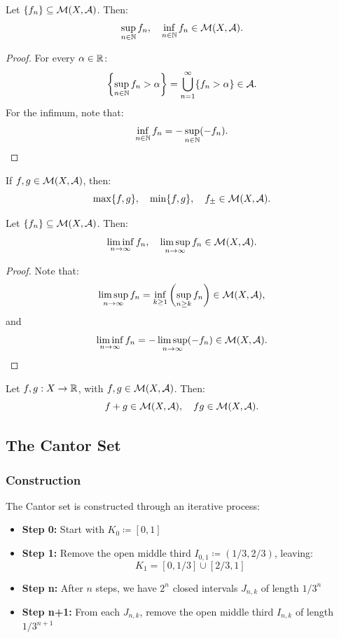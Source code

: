 \begin{theorem}
Let $\{f_n\} \subseteq \mathcal{M}(X,\mathcal{A})$. Then:
\[
\sup_{n \in \mathbb{N}} f_n, \quad \inf_{n \in \mathbb{N}} f_n \in \mathcal{M}(X,\mathcal{A}).
\]
\end{theorem}

\begin{proof}
For every $\alpha \in \mathbb{R}$:
\[
\left\{ \sup_{n \in \mathbb{N}} f_n > \alpha \right\} = \bigcup_{n=1}^{\infty} \{ f_n > \alpha \} \in \mathcal{A}.
\]
For the infimum, note that:
\[
\inf_{n \in \mathbb{N}} f_n = -\sup_{n \in \mathbb{N}} (-f_n).
\]
\end{proof}

\begin{corollary}
If $f,g \in \mathcal{M}(X,\mathcal{A})$, then:
\[
\max\{f,g\}, \quad \min\{f,g\}, \quad f_{\pm} \in \mathcal{M}(X,\mathcal{A}).
\]
\end{corollary}

\begin{theorem}
Let $\{f_n\} \subseteq \mathcal{M}(X,\mathcal{A})$. Then:
\[
\liminf_{n \to \infty} f_n, \quad \limsup_{n \to \infty} f_n \in \mathcal{M}(X,\mathcal{A}).
\]
\end{theorem}

\begin{proof}
Note that:
\[
\limsup_{n \to \infty} f_n = \inf_{k \geq 1} \left( \sup_{n \geq k} f_n \right) \in \mathcal{M}(X,\mathcal{A}),
\]
and
\[
\liminf_{n \to \infty} f_n = -\limsup_{n \to \infty} (-f_n) \in \mathcal{M}(X,\mathcal{A}).
\]
\end{proof}

\begin{theorem}
Let $f,g:X \to \mathbb{R}$, with $f,g \in \mathcal{M}(X,\mathcal{A})$. Then:
\[
f + g \in \mathcal{M}(X,\mathcal{A}), \quad fg \in \mathcal{M}(X,\mathcal{A}).
\]
\end{theorem}

\subsection{The Cantor Set}

\subsubsection{Construction}

The Cantor set is constructed through an iterative process:

\begin{itemize}
    \item \textbf{Step 0:} Start with $K_0 \coloneqq [0,1]$
    \item \textbf{Step 1:} Remove the open middle third $I_{0,1} \coloneqq (1/3, 2/3)$, leaving:
    \[
    K_1 = [0,1/3] \cup [2/3,1]
    \]
    \item \textbf{Step n:} After $n$ steps, we have $2^n$ closed intervals $J_{n,k}$ of length $1/3^n$
    \item \textbf{Step n+1:} From each $J_{n,k}$, remove the open middle third $I_{n,k}$ of length $1/3^{n+1}$
\end{itemize}


